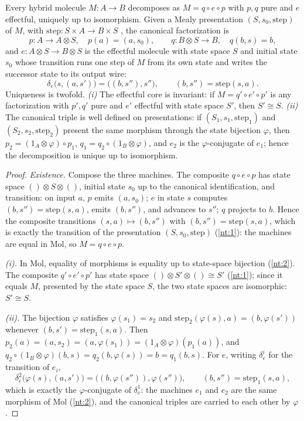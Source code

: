 \begin{theorem}\label{nt:33}
Every hybrid molecule $M : A \to B$ decomposes as $M = q \circ e \circ p$
with $p, q$ pure and $e$ effectful, uniquely up to isomorphism. Given a
Mealy presentation $(S, s_0, \mathrm{step})$ of $M$, with
$\mathrm{step} : S \times A \to B \times S$ \citep{mealy}, the canonical
factorization is
\[
p : A \to A \otimes S,\quad p(a) = (a, s_0),
\qquad
q : B \otimes S \to B,\quad q(b, s) = b ,
\]
and $e : A \otimes S \to B \otimes S$ is the effectful molecule with state
space $S$ and initial state $s_0$ whose transition runs one step of $M$
from its own state and writes the successor state to its output wire:
\[
\delta_e\bigl(s, (a, s')\bigr) = \bigl((b, s''), s''\bigr),
\qquad (b, s'') = \mathrm{step}(s, a) .
\]
Uniqueness is twofold. \emph{(i)} The effectful core is invariant: if
$M = q' \circ e' \circ p'$ is any factorization with $p', q'$ pure and
$e'$ effectful with state space $S'$, then $S' \cong S$. \emph{(ii)} The
canonical triple is well defined on presentations: if $(S_1, s_1,
\mathrm{step}_1)$ and $(S_2, s_2, \mathrm{step}_2)$ present the same
morphism through the state bijection $\varphi$, then $p_2 = (1_A \otimes
\varphi) \circ p_1$, $q_1 = q_2 \circ (1_B \otimes \varphi)$, and $e_2$ is
the $\varphi$-conjugate of $e_1$; hence the decomposition is unique up to
isomorphism.
\end{theorem}

\begin{proof}
\emph{Existence.} Compose the three machines. The composite
$q \circ e \circ p$ has state space $() \otimes S \otimes ()$, initial
state $s_0$ up to the canonical identification, and transition: on input
$a$, $p$ emits $(a, s_0)$; $e$ in state $s$ computes
$(b, s'') = \mathrm{step}(s, a)$, emits $(b, s'')$, and advances to
$s''$; $q$ projects to $b$. Hence the composite transitions
$(s, a) \mapsto (b, s'')$ with $(b, s'') = \mathrm{step}(s, a)$, which is
exactly the transition of the presentation $(S, s_0, \mathrm{step})$
(\autoref{nt:1}): the machines are equal in Mol, so $M = q \circ e \circ p$.

\emph{(i).} In Mol, equality of morphisms is equality up to state-space
bijection (\autoref{nt:2}). The composite $q' \circ e' \circ p'$ has state
space $() \otimes S' \otimes () \cong S'$ (\autoref{nt:1}); since it equals
$M$, presented by the state space $S$, the two state spaces are
isomorphic: $S' \cong S$.

\emph{(ii).} The bijection $\varphi$ satisfies $\varphi(s_1) = s_2$ and
$\mathrm{step}_2(\varphi(s), a) = (b, \varphi(s'))$ whenever
$(b, s') = \mathrm{step}_1(s, a)$. Then
$p_2(a) = (a, s_2) = (a, \varphi(s_1)) = (1_A \otimes \varphi)(p_1(a))$,
and $q_2 \circ (1_B \otimes \varphi)(b, s) = q_2(b, \varphi(s)) = b =
q_1(b, s)$. For $e$, writing $\delta_e^i$ for the transition of $e_i$,
\[
\delta_e^2\bigl(\varphi(s), (a, s')\bigr)
= \bigl((b, \varphi(s'')), \varphi(s'')\bigr),
\qquad (b, s'') = \mathrm{step}_1(s, a) ,
\]
which is exactly the $\varphi$-conjugate of $\delta_e^1$: the machines
$e_1$ and $e_2$ are the same morphism of Mol (\autoref{nt:2}), and the
canonical triples are carried to each other by $\varphi$.
\end{proof}

